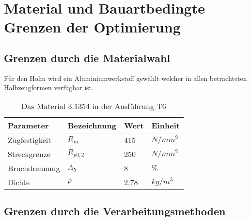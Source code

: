 \chapter{Material und Bauartbedingte Grenzen der Optimierung}\label{cha:Material- und Bauartbedingte Grenzen der Optimierung}

\section{Grenzen durch die Materialwahl}
\label{Materialwerte}

Für den Holm wird ein Aluminiumwerkstoff gewählt welcher in allen betrachteten Halbzeugformen verfügbar ist.

\begin{table}[h]
\centering
\begin{tabular}{|l|l|l|l|}
\hline
Parameter  & Bezeichnung &  Wert & Einheit \\ \hline
Zugfestigkeit  & $R_{m}$ & 415 & $N/mm^2$\\ \hline
Streckgrenze & $R_{p0,2}$  & 250 & $N/mm^2$\\ \hline
Bruchdrehnung & $A_{5}$ & 8 & $\%$ \\ \hline
Dichte & $\rho$ & 2,78 & $kg/m^3$\\ \hline
\end{tabular}
\caption{Das Material 3.1354 in der Ausführung T6}
\label{tab:Das Material 3.1354 in der Ausführung T6}
\end{table}

\section{Grenzen durch die Verarbeitungsmethoden}